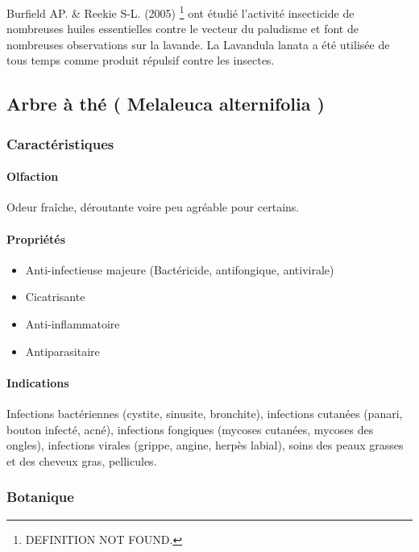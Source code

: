 \documentclass[12pt,a4wide]{article}
\begin{document}
Burfield AP. \& Reekie S-L. (2005) \footnote{DEFINITION NOT FOUND.} ont étudié l'activité insecticide de nombreuses huiles essentielles contre le vecteur du paludisme et font de nombreuses observations sur la lavande. La Lavandula lanata a été utilisée de tous temps comme produit répulsif contre les insectes. 




\subsection{Arbre à thé ( Melaleuca alternifolia )}
\label{sec-4-8}

\subsubsection{Caractéristiques}
\label{sec-4-8-1}

\paragraph{Olfaction}
\label{sec-4-8-1-1}
Odeur fraîche, déroutante voire peu agréable pour certains.

\paragraph{Propriétés}
\label{sec-4-8-1-2}

\begin{itemize}
\item Anti-infectieuse majeure (Bactéricide, antifongique, antivirale)
\item Cicatrisante
\item Anti-inflammatoire
\item Antiparasitaire
\end{itemize}

\paragraph{Indications}
\label{sec-4-8-1-3}

Infections  bactériennes  (cystite,  sinusite, bronchite),  infections  cutanées
(panari, bouton infecté, acné),  infections fongiques (mycoses cutanées, mycoses
des ongles), infections virales (grippe, angine, herpès labial), soins des peaux
grasses et des cheveux gras, pellicules.

\subsubsection{Botanique}
\label{sec-4-8-2}
\end{document}

